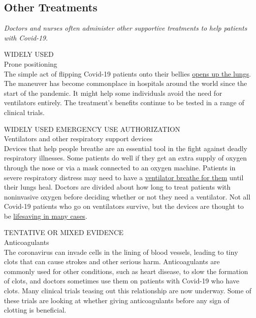 \hypertarget{other-treatments}{%
\subsection{Other Treatments}\label{other-treatments}}

\emph{Doctors and nurses often administer other supportive treatments to
help patients with Covid-19.}

WIDELY USED\\
Prone positioning\\
The simple act of flipping Covid-19 patients onto their bellies
\href{https://www.nytimes3xbfgragh.onion/2020/05/13/health/coronavirus-proning-lungs.html}{opens
up the lungs}. The maneuver has become commonplace in hospitals around
the world since the start of the pandemic. It might help some
individuals avoid the need for ventilators entirely. The treatment's
benefits continue to be tested in a range of clinical trials.

WIDELY USED EMERGENCY USE AUTHORIZATION\\
Ventilators and other respiratory support devices\\
Devices that help people breathe are an essential tool in the fight
against deadly respiratory illnesses. Some patients do well if they get
an extra supply of oxygen through the nose or via a mask connected to an
oxygen machine. Patients in severe respiratory distress may need to have
a
\href{https://www.nytimes3xbfgragh.onion/interactive/2020/05/08/health/coronavirus-covid-lungs-ventilators.html}{ventilator
breathe for them} until their lungs heal. Doctors are divided about how
long to treat patients with noninvasive oxygen before deciding whether
or not they need a ventilator. Not all Covid-19 patients who go on
ventilators survive, but the devices are thought to be
\href{https://www.nytimes3xbfgragh.onion/2020/04/26/health/coronavirus-patient-ventilator.html}{lifesaving
in many cases}.

TENTATIVE OR MIXED EVIDENCE\\
Anticoagulants\\
The coronavirus can invade cells in the lining of blood vessels, leading
to tiny clots that can cause strokes and other serious harm.
Anticoagulants are commonly used for other conditions, such as heart
disease, to slow the formation of clots, and doctors sometimes use them
on patients with Covid-19 who have clots. Many clinical trials teasing
out this relationship are now underway. Some of these trials are looking
at whether giving anticoagulants before any sign of clotting is
beneficial.

